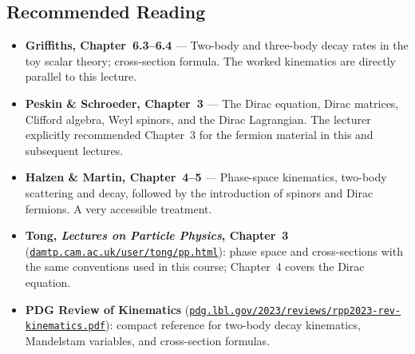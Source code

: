 \documentclass[../main.tex]{subfiles}
\begin{document}
\subsection*{Recommended Reading}

\begin{itemize}
  \item \textbf{Griffiths, Chapter~6.3--6.4} — Two-body and three-body decay rates in the toy scalar theory; cross-section formula.  The worked kinematics are directly parallel to this lecture.

  \item \textbf{Peskin \& Schroeder, Chapter~3} — The Dirac equation, Dirac matrices, Clifford algebra, Weyl spinors, and the Dirac Lagrangian.  The lecturer explicitly recommended Chapter~3 for the fermion material in this and subsequent lectures.

  \item \textbf{Halzen \& Martin, Chapter~4--5} — Phase-space kinematics, two-body scattering and decay, followed by the introduction of spinors and Dirac fermions.  A very accessible treatment.

  \item \textbf{Tong, \textit{Lectures on Particle Physics}, Chapter~3}
    (\href{https://www.damtp.cam.ac.uk/user/tong/pp.html}{\texttt{damtp.cam.ac.uk/user/tong/pp.html}}):
    phase space and cross-sections with the same conventions used in this course; Chapter~4 covers the Dirac equation.

  \item \textbf{PDG Review of Kinematics}
    (\href{https://pdg.lbl.gov/2023/reviews/rpp2023-rev-kinematics.pdf}{\texttt{pdg.lbl.gov/2023/reviews/rpp2023-rev-kinematics.pdf}}):
    compact reference for two-body decay kinematics, Mandelstam variables, and cross-section formulas.
\end{itemize}
\end{document}
